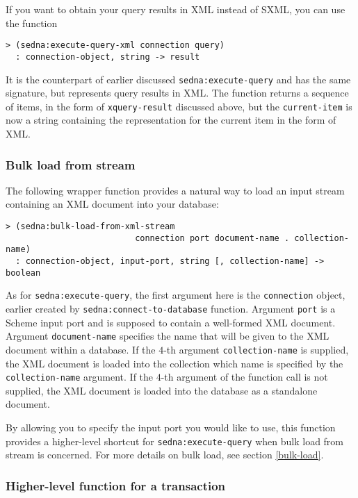 \documentclass[a4paper,12pt]{article}
\begin{document}
If you want to obtain your query results in XML instead of SXML, you can use
the function
\begin{verbatim}> (sedna:execute-query-xml connection query)
  : connection-object, string -> result\end{verbatim}
It is the counterpart of earlier discussed \texttt{sedna:execute-query} and
has the same signature, but represents query results in XML.
The function returns a sequence of items, in the form of \texttt{xquery-result}
discussed above, but the \texttt{current-item} is now a string containing the
representation for the current item in the form of XML.


\subsubsection{Bulk load from stream}

The following wrapper function provides a natural way to load an input stream
containing an XML document into your database:
\begin{verbatim}> (sedna:bulk-load-from-xml-stream
                          connection port document-name . collection-name)
  : connection-object, input-port, string [, collection-name] -> boolean\end{verbatim}

As for \texttt{sedna:execute-query}, the first argument here is the
\texttt{connection} object, earlier created by
\texttt{sedna:connect-to-database} function.
Argument \texttt{port} is a Scheme input port and is supposed to contain
a well-formed XML document.
Argument \texttt{document-name} specifies the name that will be given to the
XML document within a database.
If the $4$-th argument \texttt{collection-name} is supplied, the XML document
is loaded into the collection which name is specified by the
\texttt{collection-name} argument.
If the $4$-th argument of the function call is not supplied, the XML document
is loaded into the database as a standalone document.

By allowing you to specify the input port you would like to use, this function
provides a higher-level shortcut for \texttt{sedna:execute-query} when bulk
load from stream is concerned.
For more details on bulk load, see section \ref{bulk-load}.

\subsubsection{Higher-level function for a transaction}
\end{document}
